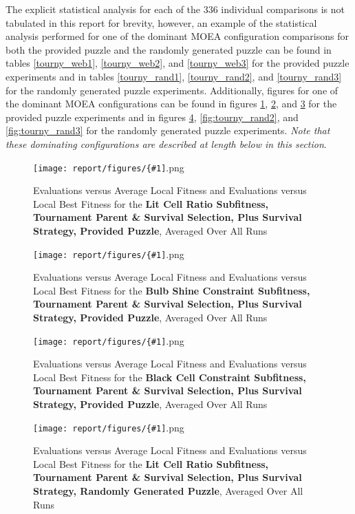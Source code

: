 \documentclass[11pt]{article}
\newcommand{\fitnessplotcaption}[1]{\caption{Evaluations versus Average Local Fitness and Evaluations versus 
    Local Best Fitness for the \textbf{{#1}}, Averaged Over All Runs}}
\newcommand{\addgraphic}[1]{\centerline{\texttt{[image: report/figures/\{\#1]}.png}}}
\begin{document}
The explicit statistical analysis for each of the 336 individual comparisons is not tabulated in 
this 
report for brevity, however, an example of the statistical analysis performed for one of the 
dominant MOEA configuration comparisons for both the provided puzzle and the randomly generated 
puzzle can be found in tables \ref{tourny_web1}, \ref{tourny_web2}, and \ref{tourny_web3} for the provided puzzle experiments and in tables 
\ref{tourny_rand1}, \ref{tourny_rand2}, and \ref{tourny_rand3} for the randomly generated puzzle experiments.  Additionally, figures for one of the dominant MOEA configurations can be found in figures \ref{fig:tourny_web1},
\ref{fig:tourny_web2}, and \ref{fig:tourny_web3} for the provided puzzle experiments and in figures \ref{fig:tourny_rand1}, \ref{fig:tourny_rand2}, and \ref{fig:tourny_rand3} 
for the randomly generated puzzle experiments. \textit{Note that these dominating configurations are described at length below in this section}.

\begin{figure}[H]
    \addgraphic{website_puzzle__tournament_parent__tournament_survival__plus__lit_cell_ratio__graph}
    \fitnessplotcaption{Lit Cell Ratio Subfitness, Tournament Parent \& Survival Selection, Plus
    Survival Strategy, Provided Puzzle}
    \label{fig:tourny_web1}
\end{figure}

\begin{figure}[H]
    \addgraphic{website_puzzle__tournament_parent__tournament_survival__plus__bulb_shine_constr__graph}
    \fitnessplotcaption{Bulb Shine Constraint Subfitness, Tournament Parent \& Survival Selection,
    Plus Survival Strategy, Provided Puzzle}
    \label{fig:tourny_web2}
\end{figure}

\begin{figure}[H]
    \addgraphic{website_puzzle__tournament_parent__tournament_survival__plus__black_cell_constr__graph}
    \fitnessplotcaption{Black Cell Constraint Subfitness, Tournament Parent \& Survival Selection,
    Plus Survival Strategy, Provided Puzzle}
    \label{fig:tourny_web3}
\end{figure}

\begin{figure}[H]
    \addgraphic{random_gen__tournament_parent__tournament_survival__plus__lit_cell_ratio__graph}
    \fitnessplotcaption{Lit Cell Ratio Subfitness, Tournament Parent \& Survival Selection, Plus
    Survival Strategy, Randomly Generated Puzzle}
    \label{fig:tourny_rand1}
\end{figure}
\end{document}
